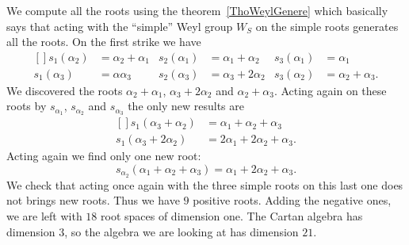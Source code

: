 We compute all the roots using the theorem~\ref{ThoWeylGenere} which basically says that acting with the ``simple'' Weyl group \( W_S\) on the simple roots generates all the roots. On the first strike we have
\begin{equation}
    \begin{aligned}[]
        s_1(\alpha_2)&=\alpha_2+\alpha_1&s_2(\alpha_1)&=\alpha_1+\alpha_2&s_3(\alpha_1)&=\alpha_1\\
        s_1(\alpha_3)&=\alpha\alpha_3 &s_2(\alpha_3)&=\alpha_3+2\alpha_2&s_3(\alpha_2)&=\alpha_2+\alpha_3.
    \end{aligned}
\end{equation}
We discovered the roots \( \alpha_2+\alpha_1\), \( \alpha_3+2\alpha_2\) and \( \alpha_2+\alpha_3\). Acting again on these roots by \( s_{\alpha_1}\), \( s_{\alpha_2}\) and \( s_{\alpha_3}\) the only new results are
\begin{equation}
    \begin{aligned}[]
        s_1(\alpha_3+\alpha_2)&=\alpha_1+\alpha_2+\alpha_3\\
        s_1(\alpha_3+2\alpha_2)&=2\alpha_1+2\alpha_2+\alpha_3.
    \end{aligned}
\end{equation}
Acting again we find only one new root:
\begin{equation}
    s_{\alpha_2}(\alpha_1+\alpha_2+\alpha_3)=\alpha_1+2\alpha_2+\alpha_3.
\end{equation}
We check that acting once again with the three simple roots on this last one does not brings new roots. Thus we have \( 9\) positive roots. Adding the negative ones, we are left with \( 18\) root spaces of dimension one. The Cartan algebra has dimension \( 3\), so the algebra we are looking at has dimension \( 21\).

